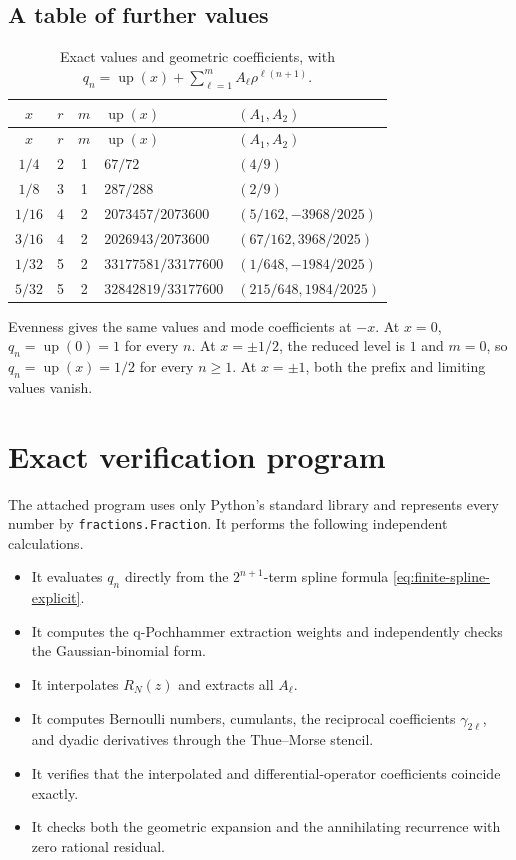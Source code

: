 \documentclass[11pt,a4paper]{article}
\theoremstyle{remark}
\newcommand{\up}{\operatorname{up}}
\begin{document}
\subsection{A table of further values}

\begin{longtable}{c c c l l}
\caption{Exact values and geometric coefficients, with
$q_n=\up(x)+\sum_{\ell=1}^{m}A_\ell\rho^{\ell(n+1)}$.}
\label{tab:examples}\\
\toprule
$x$ & $r$ & $m$ & $\up(x)$ & $(A_1,A_2)$\\
\midrule
\endfirsthead
\toprule
$x$ & $r$ & $m$ & $\up(x)$ & $(A_1,A_2)$\\
\midrule
\endhead
$1/4$ & 2 & 1 & $67/72$ & $(4/9)$\\
$1/8$ & 3 & 1 & $287/288$ & $(2/9)$\\
$1/16$ & 4 & 2 & $2073457/2073600$ & $(5/162,-3968/2025)$\\
$3/16$ & 4 & 2 & $2026943/2073600$ & $(67/162,3968/2025)$\\
$1/32$ & 5 & 2 & $33177581/33177600$ & $(1/648,-1984/2025)$\\
$5/32$ & 5 & 2 & $32842819/33177600$ & $(215/648,1984/2025)$\\
\bottomrule
\end{longtable}

Evenness gives the same values and mode coefficients at $-x$.  At $x=0$,
$q_n=\up(0)=1$ for every $n$.  At $x=\pm1/2$, the reduced level is $1$ and
$m=0$, so $q_n=\up(x)=1/2$ for every $n\ge1$.  At $x=\pm1$, both the prefix
and limiting values vanish.

\section{Exact verification program}
\label{sec:verification}

The attached program  uses only Python's
standard library and represents every number by \texttt{fractions.Fraction}.
It performs the following independent calculations.

\begin{itemize}
\item It evaluates $q_n$ directly from the $2^{n+1}$-term spline formula
\eqref{eq:finite-spline-explicit}.
\item It computes the q-Pochhammer extraction weights and independently checks
the Gaussian-binomial form.
\item It interpolates $R_N(z)$ and extracts all $A_\ell$.
\item It computes Bernoulli numbers, cumulants, the reciprocal coefficients
$\gamma_{2\ell}$, and dyadic derivatives through the Thue--Morse stencil.
\item It verifies that the interpolated and differential-operator
coefficients coincide exactly.
\item It checks both the geometric expansion and the annihilating recurrence
with zero rational residual.
\end{itemize}
\end{document}
